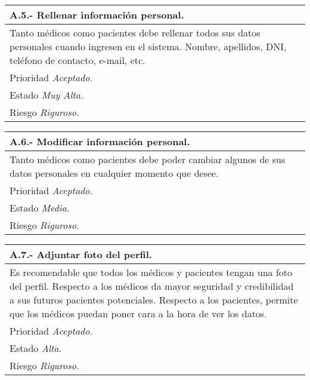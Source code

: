 	\begin{center}
	\begin{tabulary}{15cm}{|L|}
		\hline
			\bf{A.5.- Rellenar información personal.} \\
		\hline
			Tanto médicos como pacientes debe rellenar todos sus datos personales cuando ingresen en el sistema. Nombre, apellidos, DNI, teléfono de contacto, e-mail, etc. \\
		\hline
			Prioridad \textit{Aceptado.} \\
		\hline
			Estado \textit{Muy Alta.} \\
		\hline
			Riesgo \textit{Riguroso.} \\
		\hline
	\end{tabulary}
	\end{center}

	\begin{center}
	\begin{tabulary}{15cm}{|L|}
		\hline
			\bf{A.6.- Modificar información personal.} \\	
		\hline
			Tanto médicos como pacientes debe poder cambiar algunos de sus datos personales en cualquier momento que desee. \\
		\hline
			Prioridad \textit{Aceptado.} \\
		\hline
			Estado \textit{Media.} \\
		\hline
			Riesgo \textit{Riguroso.} \\
		\hline
	\end{tabulary}
	\end{center}

	\begin{center}
	\begin{tabulary}{15cm}{|L|}
		\hline
			\bf{A.7.- Adjuntar foto del perfil.} \\
		\hline
			Es recomendable que todos los médicos y pacientes tengan una foto del perfil. Respecto a los médicos da mayor seguridad y credibilidad a sus futuros pacientes potenciales. Respecto a los pacientes, permite que los médicos puedan poner cara a la hora de ver los datos. \\
		\hline
			Prioridad \textit{Aceptado.} \\
		\hline
			Estado \textit{Alta.} \\
		\hline
			Riesgo \textit{Riguroso.} \\
		\hline
	\end{tabulary}
	\end{center}

